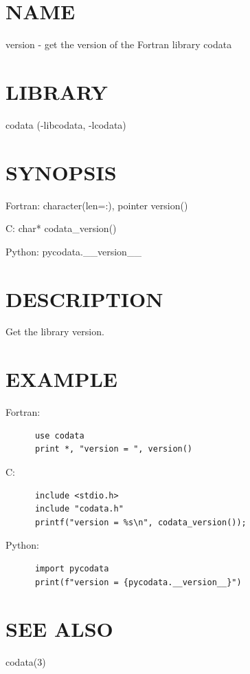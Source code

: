 \section*{NAME}
version - get the version of the Fortran library codata

\section*{LIBRARY}
codata (-libcodata, -lcodata)

\section*{SYNOPSIS}
{\ttfamily
Fortran: character(len=:), pointer version()

C: char* codata\_version()

Python: pycodata.\_\_version\_\_

}
\section*{DESCRIPTION}
Get the library version.

\section*{EXAMPLE}
Fortran:

\begin{verbatim}
      use codata
      print *, "version = ", version()

\end{verbatim}
C:

\begin{verbatim}
      include <stdio.h>
      include "codata.h"
      printf("version = %s\n", codata_version());

\end{verbatim}
Python:

\begin{verbatim}
      import pycodata
      print(f"version = {pycodata.__version__}")

\end{verbatim}
\section*{SEE ALSO}
codata(3)
